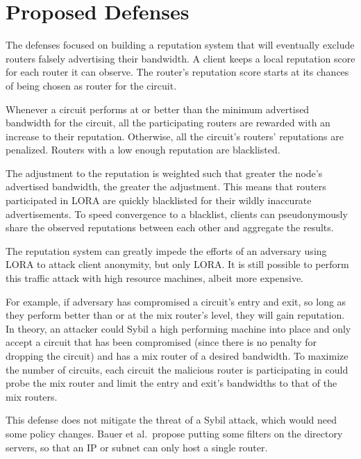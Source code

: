 \documentclass[10pt,a4paper]{article}
\begin{document}


\section{Proposed Defenses}
The defenses focused on building a reputation system that will eventually exclude routers falsely advertising their bandwidth.
A client keeps a local reputation score for each router it can observe.
The router's reputation score starts at its chances of being chosen as router for the circuit.

Whenever a circuit performs at or better than the minimum advertised bandwidth for the circuit, all the participating routers are rewarded with an increase to their reputation.
Otherwise, all the circuit's routers' reputations are penalized.
Routers with a low enough reputation are blacklisted.

The adjustment to the reputation is weighted such that greater the node's advertised bandwidth, the greater the adjustment.
This means that routers participated in LORA are quickly blacklisted for their wildly inaccurate advertisements.
To speed convergence to a blacklist, clients can pseudonymously share the observed reputations between each other and aggregate the results.

The reputation system can greatly impede the efforts of an adversary using LORA to attack client anonymity, but only LORA.  
It is still possible to perform this  traffic attack with high resource machines, albeit more expensive.

For example, if adversary has compromised a circuit's entry and exit, so long as they perform better than or at the mix router's level,  they will gain reputation.
In theory, an attacker could Sybil a high performing machine into place and only accept a circuit that has been compromised (since there is no penalty for dropping the circuit) and has a mix router of a desired bandwidth.  
To maximize the number of circuits, each circuit the malicious router is participating in could probe the mix router and limit the entry and exit's bandwidths to that of the mix routers.

This defense does not mitigate the threat of a Sybil attack, which would need some policy changes.
Bauer et al.\ propose putting some filters  on the directory servers, so that an IP or subnet can only host a single router.
\end{document}

